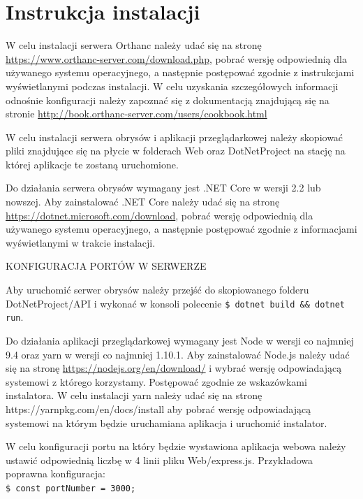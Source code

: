 \documentclass[a4paper,11pt,twoside]{report}
\theoremstyle{definition}
\begin{document}




\chapter*{Instrukcja instalacji}

W celu instalacji serwera Orthanc należy udać się na stronę \url{https://www.orthanc-server.com/download.php}, pobrać wersję odpowiednią dla używanego systemu operacyjnego, a następnie postępować zgodnie z instrukcjami wyświetlanymi podczas instalacji. W celu uzyskania szczegółowych informacji odnośnie konfiguracji należy zapoznać się z dokumentacją znajdującą się na stronie \url{http://book.orthanc-server.com/users/cookbook.html}

W celu instalacji serwera obrysów i aplikacji przeglądarkowej należy skopiować pliki znajdujące się na płycie w folderach Web oraz DotNetProject na stację na której aplikacje te zostaną uruchomione. 

Do działania serwera obrysów wymagany jest .NET Core w wersji 2.2 lub nowszej. Aby zainstalować .NET Core należy udać się na stronę \url{https://dotnet.microsoft.com/download}, pobrać wersję odpowiednią dla używanego systemu operacyjnego, a następnie postępować zgodnie z informacjami wyświetlanymi w trakcie instalacji.

KONFIGURACJA PORTÓW W SERWERZE

Aby uruchomić serwer obrysów należy przejść do skopiowanego folderu DotNetProject/API i wykonać w konsoli polecenie \texttt{\$ dotnet build \&\& dotnet run}.

Do działania aplikacji przeglądarkowej wymagany jest Node w wersji co najmniej 9.4 oraz yarn w wersji co najmniej 1.10.1. Aby zainstalować Node.js należy udać się na stronę \url{https://nodejs.org/en/download/} i wybrać wersję odpowiadającą systemowi z którego korzystamy. Postępować zgodnie ze wskazówkami instalatora. W celu instalacji yarn należy udać się na stronę https://yarnpkg.com/en/docs/install aby pobrać wersję odpowiadającą systemowi na którym będzie uruchamiana aplikacja i uruchomić instalator.

W celu konfiguracji portu na który będzie wystawiona aplikacja webowa należy ustawić odpowiednią liczbę w 4 linii pliku Web/express.js. Przykładowa poprawna konfiguracja:\\
\texttt{\$ const portNumber = 3000;}
\end{document}
